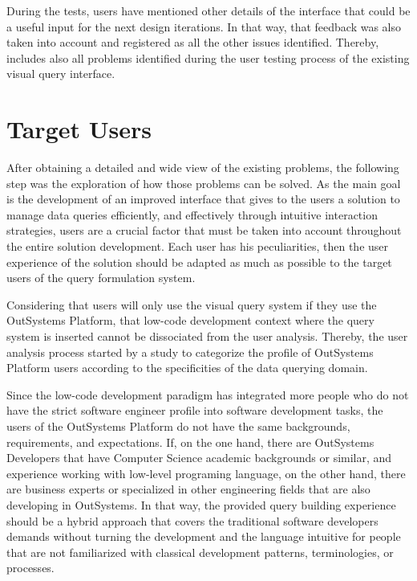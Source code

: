 During the tests, users have mentioned other details of the interface that could be a useful input for the next design iterations. In that way, that feedback was also taken into account and registered as all the other issues identified. Thereby,  includes also all problems identified during the user testing process of the existing visual query interface.


\section{Target Users}
\label{sec:target_users}

After obtaining a detailed and wide view of the existing problems, the following step was the exploration of how those problems can be solved. As the main goal is the development of an improved interface that gives to the users a solution to manage data queries efficiently, and effectively through intuitive interaction strategies, users are a crucial factor that must be taken into account throughout the entire solution development. Each user has his peculiarities, then the user experience of the solution should be adapted as much as possible to the target users of the query formulation system.

Considering that users will only use the visual query system if they use the OutSystems Platform, that low-code development context where the query system is inserted cannot be dissociated from the user analysis. Thereby, the user analysis process started by a study to categorize the profile of OutSystems Platform users according to the specificities of the data querying domain.

Since the low-code development paradigm has integrated more people who do not have the strict software engineer profile into software development tasks, the users of the OutSystems Platform do not have the same backgrounds, requirements, and expectations. If, on the one hand, there are OutSystems Developers that have Computer Science academic backgrounds or similar, and experience working with low-level programing language, on the other hand, there are business experts or specialized in other engineering fields that are also developing in OutSystems. In that way, the provided query building experience should be a hybrid approach that covers the traditional software developers demands without turning the development and the language intuitive for people that are not familiarized with classical development patterns, terminologies, or processes.

